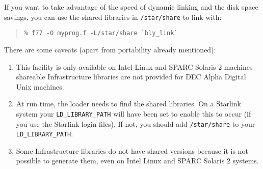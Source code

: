 \documentclass[twoside,11pt]{article}
\begin{document}
If you want to take advantage of the speed of dynamic linking and the 
disk space savings, you can use the shared libraries in \texttt{/star/share} 
to link with:

\begin{quote}
\begin{verbatim}
% f77 -O myprog.f -L/star/share `bly_link`
\end{verbatim}
\end{quote}

There are some caveats (apart from portability already mentioned):

\begin{enumerate}

\item This facility is only available on Intel Linux and SPARC Solaris
2 machines -- shareable Infrastructure libraries are not provided for
DEC Alpha Digital Unix machines.

\item At run time, the loader needs to find the shared libraries.  On a
Starlink system your \texttt{LD\_LIBRARY\_PATH} will have been set to enable
this to occur (if you use the Starlink login files).  If not, you should
add \texttt{/star/share} to your \texttt{LD\_LIBRARY\_PATH}. 

\item Some Infrastructure libraries do not have shared versions because 
it is not possible to generate them, even on Intel Linux and SPARC Solaris 2 
systems.

\end{enumerate}
\end{document}
